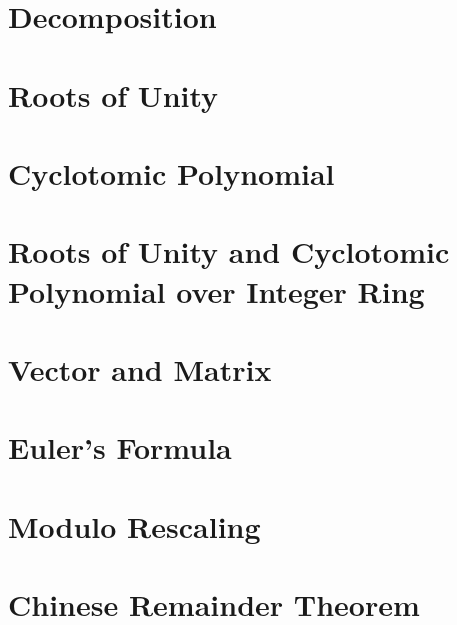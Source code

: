 \documentclass[11pt]{article}
\begin{document}
\clearpage

\section{Decomposition}
\label{sec:decomp}



\clearpage

\section{Roots of Unity}
\label{sec:roots}


\clearpage

\section{Cyclotomic Polynomial}
\label{sec:cyclotomic}


\clearpage

\section{Roots of Unity and Cyclotomic Polynomial over Integer Ring}
\label{sec:cyclotomic-polynomial-integer-ring}


\clearpage

\section{Vector and Matrix}
\label{sec:matrix}


\clearpage

\section{Euler's Formula}
\label{sec:euler}


\clearpage

\section{Modulo Rescaling}
\label{sec:modulus-rescaling}


\clearpage

\section{Chinese Remainder Theorem}
\label{sec:chinese-remainder}

\end{document}
